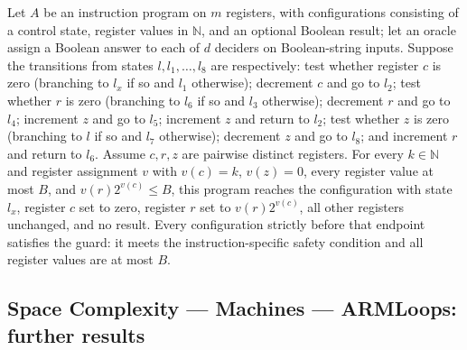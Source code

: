 \begin{theorem}
\label{Complexity.LogProg.shl_run}
\leanok
{}
Let $A$ be an instruction program on $m$ registers, with configurations consisting of a
control state, register values in $\mathbb{N}$, and an optional Boolean result; let an oracle
assign a Boolean answer to each of $d$ deciders on Boolean-string inputs. Suppose the
transitions from states $l,l_1,\ldots,l_8$ are respectively: test whether register $c$
is zero (branching to $l_x$ if so and $l_1$ otherwise); decrement $c$ and go to $l_2$;
test whether $r$ is zero (branching to $l_6$ if so and $l_3$ otherwise); decrement $r$
and go to $l_4$; increment $z$ and go to $l_5$; increment $z$ and return to $l_2$; test
whether $z$ is zero (branching to $l$ if so and $l_7$ otherwise); decrement $z$ and go
to $l_8$; and increment $r$ and return to $l_6$. Assume $c,r,z$ are pairwise distinct
registers. For every $k\in\mathbb{N}$ and register assignment $v$ with $v(c)=k$, $v(z)=0$,
every register value at most $B$, and $v(r)2^{v(c)}\le B$, this program reaches the
configuration with state $l_x$, register $c$ set to zero, register $r$ set to
$v(r)2^{v(c)}$, all other registers unchanged, and no result. Every configuration
strictly before that endpoint satisfies the guard: it meets the instruction-specific
safety condition and all register values are at most $B$.
\end{theorem}

\subsection*{Space Complexity --- Machines --- ARMLoops: further results}

